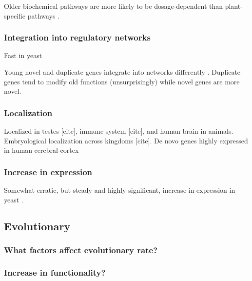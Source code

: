   Older biochemical pathways are more likely to be dosage-dependent than
  plant-specific pathways \cite{shi_genome-wide_2015}.

  \subsubsection{Integration into regulatory networks}

  Fast in yeast \cite{abrusan_integration_2013}

  \FloatBarrier

  Young novel and duplicate genes integrate into networks differently
  \cite{capra_novel_2010}. Duplicate genes tend to modify old functions
  (unsurprisingly) while novel genes are more novel.

  \subsubsection{Localization}
        
  Localized in testes [cite], immune system [cite], and human
  brain \cite{li_human-specific_2010} in animals.
  Embryological localization across kingdoms [cite].  De novo
  genes highly expressed in human cerebral cortex
  \cite{wu_novo_2011}

  \subsubsection{Increase in expression}

  
  Somewhat erratic, but steady and highly significant, increase in
  expression in yeast \cite{carvunis_proto-genes_2012}.

\subsection{Evolutionary}

  \subsubsection{What factors affect evolutionary rate?}

  \subsubsection{Increase in functionality?}

